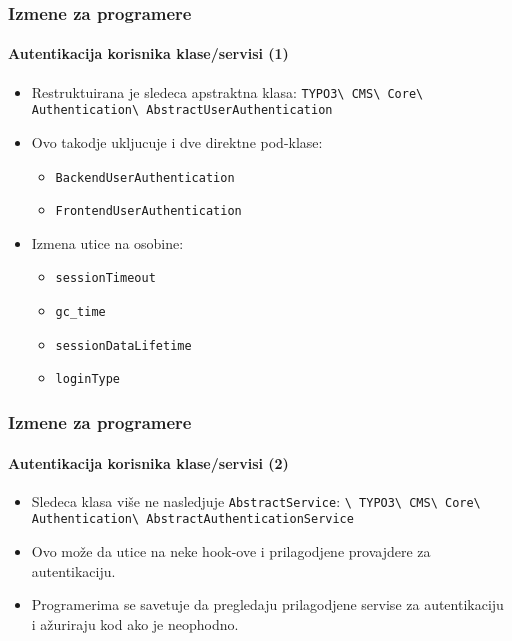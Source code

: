 \begin{frame}[fragile]
	\frametitle{Izmene za programere}
	\framesubtitle{Autentikacija korisnika klase/servisi (1)}

	\begin{itemize}
		\item Restruktuirana je sledeca apstraktna klasa:\newline
			\small\texttt{TYPO3\textbackslash
				CMS\textbackslash
				Core\textbackslash
				Authentication\textbackslash
				AbstractUserAuthentication}\normalsize
		\item Ovo takodje ukljucuje i dve direktne pod-klase:

			\begin{itemize}
				\item \texttt{BackendUserAuthentication}
				\item \texttt{FrontendUserAuthentication}
			\end{itemize}

		\item Izmena utice na osobine:

			\begin{itemize}
				\item \texttt{sessionTimeout}
				\item \texttt{gc\_time}
				\item \texttt{sessionDataLifetime}
				\item \texttt{loginType}
			\end{itemize}

	\end{itemize}

\end{frame}


\begin{frame}[fragile]
	\frametitle{Izmene za programere}
	\framesubtitle{Autentikacija korisnika klase/servisi (2)}

	\begin{itemize}

		\item Sledeca klasa više ne nasledjuje
			\smaller\texttt{AbstractService}\normalsize\hspace{0.1cm}:
			\smaller\texttt{\textbackslash
				TYPO3\textbackslash
				CMS\textbackslash
				Core\textbackslash
				Authentication\textbackslash
				AbstractAuthenticationService}\normalsize

		\item Ovo može da utice na neke hook-ove i prilagodjene provajdere za autentikaciju.

		\item Programerima se savetuje da pregledaju prilagodjene servise za autentikaciju i ažuriraju kod ako je neophodno.


	\end{itemize}

\end{frame}

